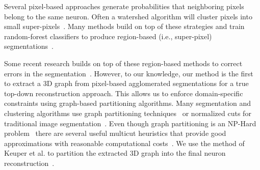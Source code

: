 Several pixel-based approaches generate probabilities that neighboring pixels belong to the same neuron.
Often a watershed algorithm will cluster pixels into small super-pixels~\cite{zlateski2015image}. 
Many methods build on top of these strategies and train random-forest classifiers to produce region-based (i.e., super-pixel) segmentations~\cite{seymour2016rhoananet,nunez2014graph,10.1371/journal.pone.0125825,parag2017anisotropic,zlateski2015image}.


Some recent research builds on top of these region-based methods to correct errors in the segmentation~\cite{rolnick2017morphological,error_correction_using_CNN,haehn2017guided}.
However, to our knowledge, our method is the first to extract a 3D graph from pixel-based agglomerated segmentations for a true top-down reconstruction approach. This allows us to enforce domain-specific constraints using graph-based partitioning algorithms. Many segmentation and clustering algorithms use graph partitioning techniques~\cite{andres2012globally} or normalized cuts for traditional image segmentation~\cite{kappes2016higher,shi2000normalized,tatiraju2008image}.
Even though graph partitioning is an NP-Hard problem~\cite{demaine2006correlation} there are several useful multicut heuristics that provide good approximations with reasonable computational costs~\cite{horvnakova2017analysis}. We use the method of Keuper et al. to partition the extracted 3D graph into the final neuron reconstruction~\cite{keuper2015efficient}.
